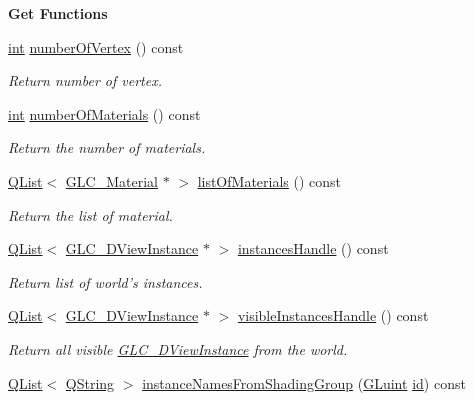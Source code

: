 \begin{Indent}{\bf Get Functions}
\begin{DoxyCompactItemize}
\hyperlink{ioapi_8h_a787fa3cf048117ba7123753c1e74fcd6}{int} \hyperlink{class_g_l_c___world_adf50fa12377dfe5116092ab26c5eb772}{number\-Of\-Vertex} () const 
\begin{DoxyCompactList}\small\item\em Return number of vertex. \end{DoxyCompactList}\item 
\hyperlink{ioapi_8h_a787fa3cf048117ba7123753c1e74fcd6}{int} \hyperlink{class_g_l_c___world_a63bd606e788d44ca86e35f33928798bd}{number\-Of\-Materials} () const 
\begin{DoxyCompactList}\small\item\em Return the number of materials. \end{DoxyCompactList}\item 
\hyperlink{class_q_list}{Q\-List}$<$ \hyperlink{class_g_l_c___material}{G\-L\-C\-\_\-\-Material} $\ast$ $>$ \hyperlink{class_g_l_c___world_a154bb11ee079e827035256fcd117dcb7}{list\-Of\-Materials} () const 
\begin{DoxyCompactList}\small\item\em Return the list of material. \end{DoxyCompactList}\item 
\hyperlink{class_q_list}{Q\-List}$<$ \hyperlink{class_g_l_c__3_d_view_instance}{G\-L\-C\-\_\-D\-View\-Instance} $\ast$ $>$ \hyperlink{class_g_l_c___world_ac51b4ff649fe70d6c0437d95a1ad6996}{instances\-Handle} () const 
\begin{DoxyCompactList}\small\item\em Return list of world's instances. \end{DoxyCompactList}\item 
\hyperlink{class_q_list}{Q\-List}$<$ \hyperlink{class_g_l_c__3_d_view_instance}{G\-L\-C\-\_\-D\-View\-Instance} $\ast$ $>$ \hyperlink{class_g_l_c___world_a654de0ac04491320d92d93e72d28828c}{visible\-Instances\-Handle} () const 
\begin{DoxyCompactList}\small\item\em Return all visible \hyperlink{class_g_l_c__3_d_view_instance}{G\-L\-C\-\_\-D\-View\-Instance} from the world. \end{DoxyCompactList}\item 
\hyperlink{class_q_list}{Q\-List}$<$ \hyperlink{group___u_a_v_objects_plugin_gab9d252f49c333c94a72f97ce3105a32d}{Q\-String} $>$ \hyperlink{class_g_l_c___world_a609d50ee869ae9a74394a2890d46094f}{instance\-Names\-From\-Shading\-Group} (\hyperlink{glext_8h_a2f0c8cd5c21f9fcbd931c3f48bc90dfc}{G\-Luint} \hyperlink{glext_8h_a58c2a664503e14ffb8f21012aabff3e9}{id}) const 

\end{DoxyCompactItemize}
\end{Indent}
